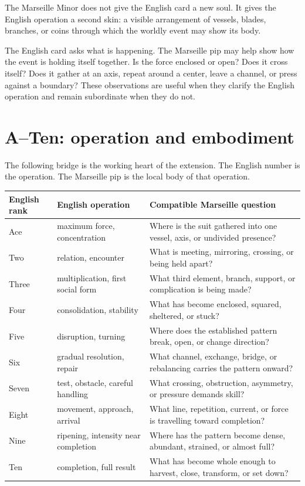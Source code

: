 The Marseille Minor does not give the English card a new soul. It gives the
English operation a second skin: a visible arrangement of vessels, blades,
branches, or coins through which the worldly event may show its body.

The English card asks what is happening. The Marseille pip may help show how the
event is holding itself together. Is the force enclosed or open? Does it cross
itself? Does it gather at an axis, repeat around a center, leave a channel, or
press against a boundary? These observations are useful when they clarify the
English operation and remain subordinate when they do not.

\section{A--Ten: operation and embodiment}

The following bridge is the working heart of the extension. The English number
is the operation. The Marseille pip is the local body of that operation.

\begin{longtable}{p{}p{}p{}}
\toprule
English rank & English operation & Compatible Marseille question \\
\midrule
Ace & maximum force, concentration & Where is the suit gathered into one vessel, axis, or undivided presence? \\
Two & relation, encounter & What is meeting, mirroring, crossing, or being held apart? \\
Three & multiplication, first social form & What third element, branch, support, or complication is being made? \\
Four & consolidation, stability & What has become enclosed, squared, sheltered, or stuck? \\
Five & disruption, turning & Where does the established pattern break, open, or change direction? \\
Six & gradual resolution, repair & What channel, exchange, bridge, or rebalancing carries the pattern onward? \\
Seven & test, obstacle, careful handling & What crossing, obstruction, asymmetry, or pressure demands skill? \\
Eight & movement, approach, arrival & What line, repetition, current, or force is travelling toward completion? \\
Nine & ripening, intensity near completion & Where has the pattern become dense, abundant, strained, or almost full? \\
Ten & completion, full result & What has become whole enough to harvest, close, transform, or set down? \\
\bottomrule
\end{longtable}

